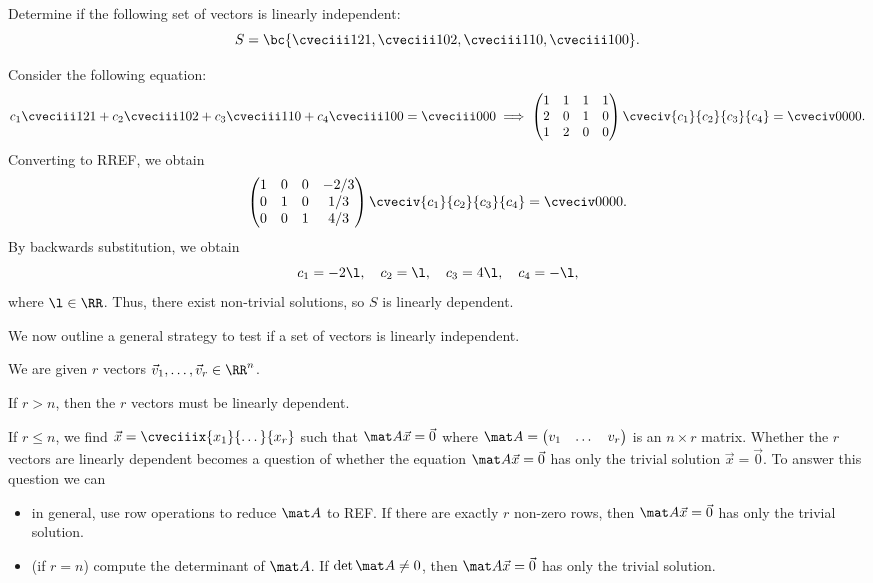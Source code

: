 \begin{sample}
    Determine if the following set of vectors is linearly independent: \[S = \bc{\cveciii121, \cveciii102, \cveciii110, \cveciii100}.\]
\end{sample}
\begin{sampans}
    Consider the following equation: \[c_1 \cveciii121 + c_2 \cveciii102 + c_3 \cveciii110 + c_4 \cveciii100 = \cveciii000 \implies \begin{pmatrix}1 & 1 & 1 & 1 \\ 2 & 0 & 1 & 0 \\ 1 & 2 & 0 & 0\end{pmatrix} \cveciv{c_1}{c_2}{c_3}{c_4} = \cveciv0000.\] Converting to RREF, we obtain \[\begin{pmatrix}1 & 0 & 0 & -2/3 \\ 0 & 1 & 0 & 1/3 \\ 0 & 0 & 1 & 4/3\end{pmatrix} \cveciv{c_1}{c_2}{c_3}{c_4} = \cveciv0000.\] By backwards substitution, we obtain \[c_1 = -2\l, \quad c_2 = \l, \quad c_3 = 4\l, \quad c_4 = -\l,\] where $\l \in \RR$. Thus, there exist non-trivial solutions, so $S$ is linearly dependent.
\end{sampans}

We now outline a general strategy to test if a set of vectors is linearly independent.

\begin{recipe}
    We are given $r$ vectors $\vec v_1, \dots, \vec v_r \in \RR^n$.

     If $r > n$, then the $r$ vectors must be linearly dependent.
    
     If $r \leq n$, we find $\vec x = \cveciiix{x_1}{\dots}{x_r}$ such that $\mat A \vec x = \vec 0$ where $\mat A = \begin{pmatrix}v_1 & \dots & v_r\end{pmatrix}$ is an $n \times r$ matrix. Whether the $r$ vectors are linearly dependent becomes a question of whether the equation $\mat A \vec x = \vec 0$ has only the trivial solution $\vec x = \vec 0$. To answer this question we can
    \begin{itemize}
        \item in general, use row operations to reduce $\mat A$ to REF. If there are exactly $r$ non-zero rows, then $\mat A \vec x = \vec 0$ has only the trivial solution.
        \item (if $r = n$) compute the determinant of $\mat A$. If $\det \mat A \neq 0$, then $\mat A \vec x = \vec 0$ has only the trivial solution.
    \end{itemize}
\end{recipe}

